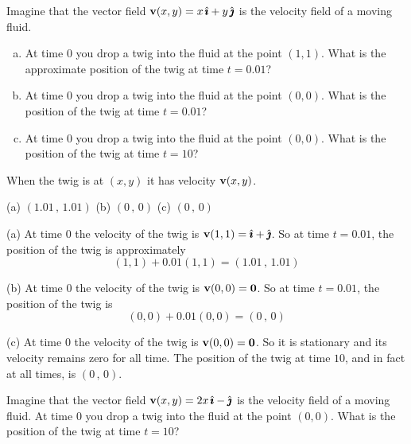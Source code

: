 \begin{question}
Imagine that the vector field $\mathbf{v}(x,y) = x\,\hat{\pmb{\imath}}+y\,\hat{\pmb{\jmath}}$ 
is the velocity field of a moving fluid.
\begin{enumerate}[(a)]
\item
At time $0$ you drop a twig into the fluid at
the point $(1,1)$. What is the approximate position of the twig
at time $t=0.01$?
\item
At time $0$ you drop a twig into the fluid at
the point $(0,0)$. What is the position of the twig
at time $t=0.01$? 
\item 
At time $0$ you drop a twig into the fluid at
the point $(0,0)$. What is the position of the twig
at time $t=10$?
\end{enumerate}
\end{question}

\begin{hint} 
When the twig is at $(x,y)$ it has velocity $\mathbf{v}(x,y)$.
\end{hint}

\begin{answer} 
(a) $(1.01\,,\,1.01)$\qquad
(b) $(0\,,\,0)$\qquad
(c) $(0\,,\,0)$
\end{answer}

\begin{solution}
(a) 
At time $0$ the velocity of the twig is
$\mathbf{v}(1,1) =\hat{\pmb{\imath}}+\hat{\pmb{\jmath}}$. So at time $t=0.01$, the position of the
twig is approximately
\begin{equation*}
(1,1) + 0.01(1,1) = (1.01\,,\,1.01)
\end{equation*}

(b) 
At time $0$ the velocity of the twig is
$\mathbf{v}(0,0) =\mathbf{0}$. So at time $t=0.01$, the position of the
twig is
\begin{equation*}
(0,0) + 0.01(0,0) = (0\,,\,0)
\end{equation*}

(c) At time $0$ the velocity of the twig is $\mathbf{v}(0,0) =\mathbf{0}$.
So it is stationary and its velocity remains zero for all time.
The position of the twig at time $10$, and in fact at all times,
is $(0\,,\,0)$.

\end{solution}

\begin{question}
Imagine that the vector field $\mathbf{v}(x,y) = 2x\,\hat{\pmb{\imath}} -\hat{\pmb{\jmath}}$ 
is the velocity field of a moving fluid.
At time $0$ you drop a twig into the fluid at
the point $(0,0)$. What is the position of the twig
at time $t=10$?
\end{question}

